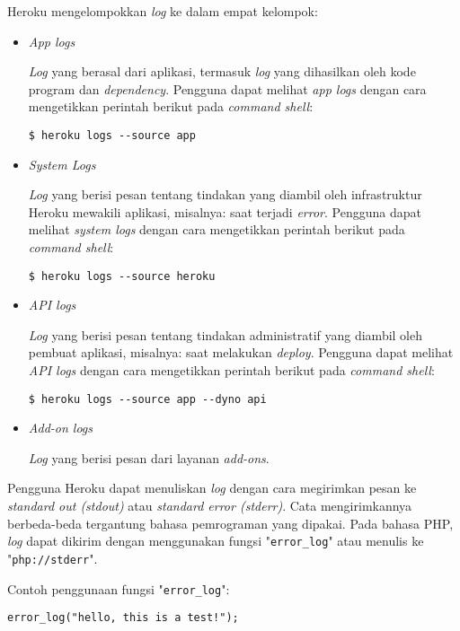 Heroku mengelompokkan \textit{log} ke dalam empat kelompok:
\begin{itemize}
\item \textit{App logs}

\textit{Log} yang berasal dari aplikasi, termasuk \textit{log} yang dihasilkan oleh kode program dan \textit{dependency}. Pengguna dapat melihat \textit{app logs} dengan cara mengetikkan perintah berikut pada \textit{command shell}:
\begin{lstlisting}
$ heroku logs --source app
\end{lstlisting}

\item \textit{System Logs}

\textit{Log} yang berisi pesan tentang tindakan yang diambil oleh infrastruktur Heroku mewakili aplikasi, misalnya: saat terjadi \textit{error}. Pengguna dapat melihat \textit{system logs} dengan cara mengetikkan perintah berikut pada \textit{command shell}:
\begin{lstlisting}
$ heroku logs --source heroku
\end{lstlisting}

\item \textit{API logs} 

\textit{Log} yang berisi pesan tentang tindakan administratif yang diambil oleh pembuat aplikasi, misalnya: saat melakukan \textit{deploy}. Pengguna dapat melihat \textit{API logs} dengan cara mengetikkan perintah berikut pada \textit{command shell}:
\begin{lstlisting}
$ heroku logs --source app --dyno api
\end{lstlisting}

\item \textit{Add-on logs}

\textit{Log} yang berisi pesan dari layanan \textit{add-ons}.
\end{itemize}

Pengguna Heroku dapat menuliskan \textit{log} dengan cara megirimkan pesan ke \textit{standard out (stdout)} atau \textit{standard error (stderr)}. Cata mengirimkannya berbeda-beda tergantung bahasa pemrograman yang dipakai. Pada bahasa PHP, \textit{log} dapat dikirim dengan menggunakan fungsi "\texttt{error\_log}" atau menulis ke "\texttt{php://stderr}".

Contoh penggunaan fungsi "\texttt{error\_log}":
\begin{lstlisting}
error_log("hello, this is a test!");
\end{lstlisting}


